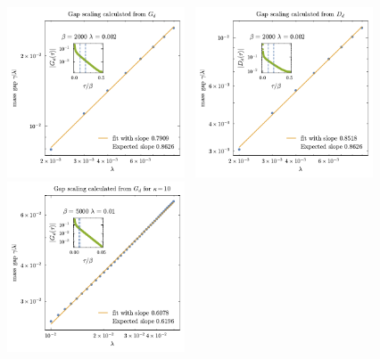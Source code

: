 \begin{figure}[t!]
    \centering
        \includegraphics[width=0.47\textwidth]{figures/chapter3/GdGapscalingv2.pdf}
        ~\includegraphics[width=0.47\textwidth]{figures/chapter3/DdGapscalingv2.pdf} \\
        \includegraphics[width=0.47\textwidth]{figures/chapter3/kappa10GdGapscalingv2.pdf}

\end{figure}
